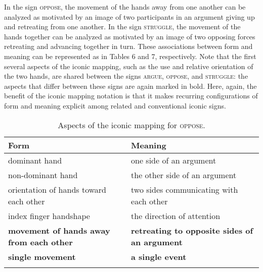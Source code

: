 \documentclass[output=paper,
modfonts
]{LSP/langsci}
\begin{document}
In the sign \textsc{oppose}, the movement of the hands away from one another can be analyzed as motivated by an image of two participants in an argument giving up and retreating from one another. In the sign \textsc{struggle}, the movement of the hands together can be analyzed as motivated by an image of two opposing forces retreating and advancing together in turn. These associations between form and meaning can be represented as in Tables 6 and 7, respectively. Note that the first several aspects of the iconic mapping, such as the use and relative orientation of the two hands, are shared between the signs \textsc{argue}, \textsc{oppose}, and \textsc{struggle}: the aspects that differ between these signs are again marked in bold. Here, again, the benefit of the iconic mapping notation is that it makes recurring configurations of form and meaning explicit among related and conventional iconic signs.

\begin{table}
\caption{Aspects of the iconic mapping for \textsc{oppose}.}
\label{tab:6}
\begin{tabularx}{\linewidth}{XX}
\lsptoprule
Form & Meaning\\
\midrule
dominant hand & one side of an argument\\

non-dominant hand & the other side of an argument\\

orientation of hands toward each other & two sides communicating with each other\\

index finger handshape & the direction of attention\\

\textbf{movement of hands away from each other} & \textbf{retreating to opposite sides of an argument}\\

\textbf{single movement} & \textbf{a single event}\\
\lspbottomrule
\end{tabularx}
\end{table}
\end{document}
